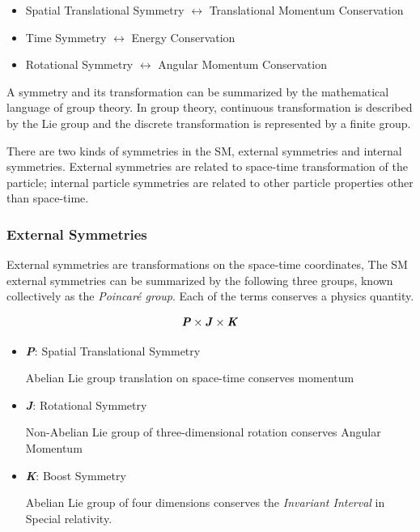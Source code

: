     \begin{itemize}

        \item Spatial Translational Symmetry $\leftrightarrow$ Translational Momentum Conservation
        \item Time Symmetry $\leftrightarrow$ Energy Conservation
        \item Rotational Symmetry $\leftrightarrow$ Angular Momentum Conservation
    \end{itemize}

    A symmetry and its transformation can be summarized by the mathematical language of group theory. In group theory, continuous transformation is described by the Lie group and the discrete transformation is represented by a finite group. 

    There are two kinds of symmetries in the SM, external symmetries and internal symmetries. External symmetries are related to space-time transformation of the particle; internal particle symmetries are related to other particle properties other than space-time. 

\subsubsection{External Symmetries} 
External symmetries are transformations on the space-time coordinates, The SM external symmetries can be summarized by the following three groups, known collectively as the \textit{Poincar\'{e} group}. Each of the terms conserves a physics quantity. 
    
     \begin{equation}
     \textbf{\textit{P}} \times \textbf{\textit{J}} \times \textbf{\textit{K}}
     \end{equation}
     
    \begin{itemize}
        \item \textbf{\textit{P}}: Spatial Translational Symmetry

            Abelian Lie group translation on space-time conserves momentum 
        \item \textbf{\textit{J}}: Rotational Symmetry

            Non-Abelian Lie group of three-dimensional rotation conserves Angular Momentum 
        \item \textbf{\textit{K}}: Boost Symmetry 

            Abelian Lie group of four dimensions conserves the \textit{Invariant Interval} in Special relativity.
    \end{itemize}


